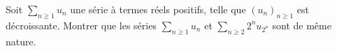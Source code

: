 \begin{exercice}
    Soit $\sum\limits_{n \geqslant 1} u_n$ une série à termes réels positifs, telle que $(u_n)_{n \geqslant 1}$ est décroissante. Montrer que les séries $\sum\limits_{n \geqslant 1} u_n$ et $\sum\limits_{n \geqslant 2} 2^n u_{2^n}$ sont de même nature. 
\end{exercice}